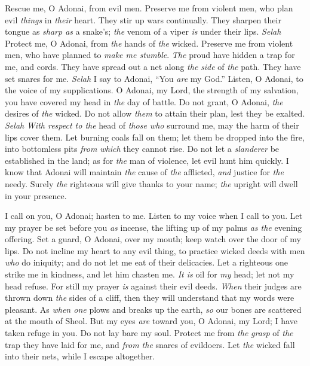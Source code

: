 \begin{biblechapter} %
 Rescue me, O Adonai, from evil men. 
Preserve me from violent men,
\verse who plan evil \textit{things} in \textit{their} heart. 
They stir up wars continually.
\verse They sharpen their tongue as \textit{sharp as} a snake’s; 
\textit{the} venom of a viper \textit{is} under their lips. \textit{Selah}
\verse Protect me, O Adonai, from \textit{the} hands of \textit{the} wicked. 
Preserve me from violent men, 
who have planned to \textit{make me stumble}.
\verse \textit{The} proud have hidden a trap for me, and cords. 
They have spread out a net along \textit{the} \textit{side} of \textit{the} path. 
They have set snares for me. \textit{Selah}
\verse I say to Adonai, “You \textit{are} my God.” 
Listen, O Adonai, to the voice of my supplications.
\verse O Adonai, my Lord, the strength of my salvation, 
you have covered my head in \textit{the} day of battle.
\verse Do not grant, O Adonai, \textit{the} desires of \textit{the} wicked. 
Do not allow \textit{them} to attain their plan, lest they be exalted. \textit{Selah}
\verse \textit{With respect to the} head of \textit{those who} surround me, 
may the harm of their lips cover them.
\verse Let burning coals fall on them; 
let them be dropped into the fire, 
into bottomless pits \textit{from which} they cannot rise.
\verse Do not let a \textit{slanderer} be established in the land; 
as for \textit{the} man of violence, let evil hunt him quickly.
\verse I know that Adonai will maintain \textit{the} cause of \textit{the} afflicted, 
\textit{and} justice for \textit{the} needy.
\verse Surely \textit{the} righteous will give thanks to your name; 
\textit{the} upright will dwell in your presence.
\end{biblechapter}

\begin{biblechapter} %
 I call on you, O Adonai; hasten to me. 
Listen to my voice when I call to you.
\verse Let my prayer be set before you \textit{as} incense, 
the lifting up of my palms \textit{as the} evening offering.
\verse Set a guard, O Adonai, over my mouth; 
keep watch over the door of my lips.
\verse Do not incline my heart to any evil thing, 
to practice wicked deeds 
with men \textit{who} do iniquity; 
and do not let me eat of their delicacies.
\verse Let a righteous one strike me in kindness, 
and let him chasten me. 
\textit{It is} oil for \textit{my} head; let not my head refuse. 
For still my prayer \textit{is} against their evil deeds.
\verse \textit{When} their judges are thrown down \textit{the} sides of a cliff, 
then they will understand that my words were pleasant.
\verse As \textit{when one} plows and breaks up the earth, 
\textit{so} our bones are scattered at the mouth of Sheol.
\verse But my eyes \textit{are} toward you, O Adonai, my Lord; 
I have taken refuge in you. Do not lay bare my soul.
\verse Protect me from \textit{the} \textit{grasp} of \textit{the} trap they have laid for me, 
and \textit{from the} snares of evildoers.
\verse Let \textit{the} wicked fall into their nets, 
while I escape altogether.
\end{biblechapter}

